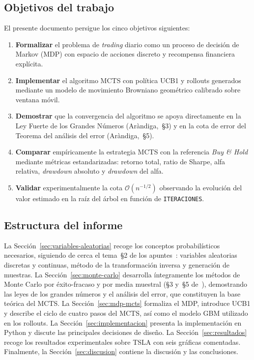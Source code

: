 \subsection{Objetivos del trabajo}
\label{subsec:objetivos}

El presente documento persigue los cinco objetivos siguientes:

\begin{enumerate}
    \item[(O1)] \textbf{Formalizar} el problema de \emph{trading} diario como un proceso de decisión de Markov (MDP) con espacio de acciones discreto y recompensa financiera explícita.
    \item[(O2)] \textbf{Implementar} el algoritmo MCTS con política UCB1 y rollouts generados mediante un modelo de movimiento Browniano geométrico calibrado sobre ventana móvil.
    \item[(O3)] \textbf{Demostrar} que la convergencia del algoritmo se apoya directamente en la Ley Fuerte de los Grandes Números (Aràndiga,~\S3) y en la cota de error del Teorema del análisis del error (Aràndiga,~\S5).
    \item[(O4)] \textbf{Comparar} empíricamente la estrategia MCTS con la referencia \emph{Buy \& Hold} mediante métricas estandarizadas: retorno total, ratio de Sharpe, alfa relativa, \emph{drawdown} absoluto y \emph{drawdown} del alfa.
    \item[(O5)] \textbf{Validar} experimentalmente la cota $\mathcal{O}(n^{-1/2})$ observando la evolución del valor estimado en la raíz del árbol en función de \texttt{ITERACIONES}.
\end{enumerate}

\subsection{Estructura del informe}
\label{subsec:estructura}

La Sección~\ref{sec:variables-aleatorias} recoge los conceptos probabilísticos necesarios, siguiendo de cerca el tema~\S2 de los apuntes~\cite{arandiga}: variables aleatorias discretas y continuas, método de la transformación inversa y generación de muestras. La Sección~\ref{sec:monte-carlo} desarrolla íntegramente los métodos de Monte Carlo por éxito-fracaso y por media muestral (\S3 y~\S5 de~\cite{arandiga}), demostrando las leyes de los grandes números y el análisis del error, que constituyen la base teórica del MCTS. La Sección~\ref{sec:mdp-mcts} formaliza el MDP, introduce UCB1 y describe el ciclo de cuatro pasos del MCTS, así como el modelo GBM utilizado en los rollouts. La Sección~\ref{sec:implementacion} presenta la implementación en Python y discute las principales decisiones de diseño. La Sección~\ref{sec:resultados} recoge los resultados experimentales sobre TSLA con seis gráficas comentadas. Finalmente, la Sección~\ref{sec:discusion} contiene la discusión y las conclusiones.
